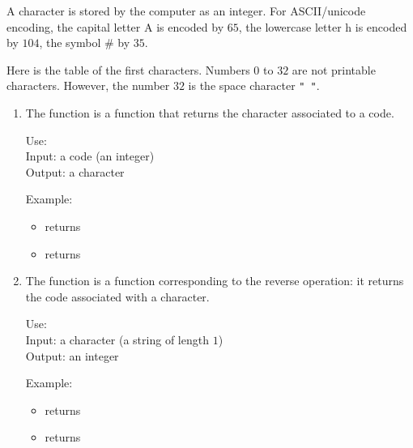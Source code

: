 \documentclass[11pt,class=report,crop=false]{standalone}
\begin{document}
\begin{cours}


A character is stored by the computer as an integer.
For ASCII/unicode encoding, the capital letter \og{}A\fg{} is encoded by $65$, the lowercase letter \og{}h\fg{} is encoded by $104$, the symbol \og{}\#\fg{} by $35$.

Here is the table of the first characters. Numbers $0$ to $32$ are not printable characters. However, the number $32$ is the space character \lstinline[showstringspaces=true]!" "!.



\begin{enumerate}  

  \item The function  is a \Python{} function that returns the character associated to a code.
  
  \begin{fonctionpython}
  Use: \\
  Input: a code (an integer)\\
  Output: a character
  
  \medskip
     
   Example:
  \begin{itemize}  
    \item {} returns 
    \item {} returns 
  \end{itemize} 
  \end{fonctionpython} 
  
  \item The function  is a \Python{} function corresponding to the reverse operation: it returns the code associated with a character.
  
  \smallskip
  
  \begin{fonctionpython}
  Use: \\
  Input: a character (a string of length $1$)\\
  Output: an integer
  
  \medskip
     
  Example:
  \begin{itemize}  
    \item {} returns 
    \item {} returns 
  \end{itemize} 
  \end{fonctionpython}  
\end{enumerate}
\end{cours}
\end{document}
